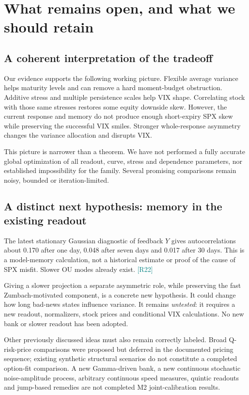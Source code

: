 \documentclass[11pt,a4paper]{article}
\newcommand{\src}[1]{\textcolor{teal}{\small[#1]}}
\begin{document}
\section{What remains open, and what we should retain}
\subsection{A coherent interpretation of the tradeoff}
Our evidence supports the following working picture. Flexible average variance helps maturity levels and can remove a hard moment-budget obstruction. Additive stress and multiple persistence scales help VIX shape. Correlating stock with those same stresses restores some equity downside skew. However, the current response and memory do not produce enough short-expiry SPX skew while preserving the successful VIX smiles. Stronger whole-response asymmetry changes the variance allocation and disrupts VIX.

This picture is narrower than a theorem. We have not performed a fully accurate global optimization of all readout, curve, stress and dependence parameters, nor established impossibility for the family. Several promising comparisons remain noisy, bounded or iteration-limited.

\subsection{A distinct next hypothesis: memory in the existing readout}
The latest stationary Gaussian diagnostic of feedback $Y$ gives autocorrelations about 0.170 after one day, 0.048 after seven days and 0.017 after 30 days. This is a model-memory calculation, not a historical estimate or proof of the cause of SPX misfit. Slower OU modes already exist. \src{R22}

Giving a slower projection a separate asymmetric role, while preserving the fast Zumbach-motivated component, is a concrete new hypothesis. It could change how long bad-news states influence variance. It remains \emph{untested}: it requires a new readout, normalizers, stock prices and conditional VIX calculations. No new bank or slower readout has been adopted.

Other previously discussed ideas must also remain correctly labeled. Broad Q-risk-price comparisons were proposed but deferred in the documented pricing sequence; existing synthetic structural scenarios do not constitute a completed option-fit comparison. A new Gamma-driven bank, a new continuous stochastic noise-amplitude process, arbitrary continuous speed measures, quintic readouts and jump-based remedies are not completed M2 joint-calibration results.
\end{document}
